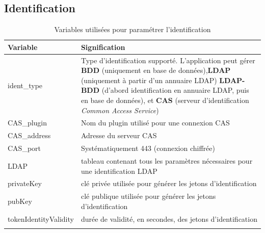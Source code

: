 \subsection{Identification}\label{paramident}
\begin{longtable}{|p{5cm}|p{8cm}|}
\hline
\textbf{Variable} & \textbf{Signification} \\
\hline
\endhead
ident\_type & Type d'identification supporté. L'application peut gérer \textbf{BDD} (uniquement en base de données),\textbf{LDAP} (uniquement à partir d'un annuaire LDAP) \textbf{LDAP-BDD} (d'abord identification en annuaire LDAP, puis en base de données), et \textbf{CAS} (serveur d'identification \textit{Common Access Service})\\
\hline
CAS\_plugin & Nom du plugin utilisé pour une connexion CAS \\
\hline
CAS\_address & Adresse du serveur CAS\\
\hline
CAS\_port & Systématiquement 443 (connexion chiffrée)\\
\hline
LDAP & tableau contenant tous les paramètres nécessaires pour une identification LDAP \\
\hline
privateKey & clé privée utilisée pour générer les jetons d'identification \\
\hline
pubKey & clé publique utilisée pour générer les jetons d'identification \\
\hline
tokenIdentityValidity & durée de validité, en secondes, des jetons d'identification\\
\hline
\caption{Variables utilisées pour paramétrer l'identification}
\end{longtable}

